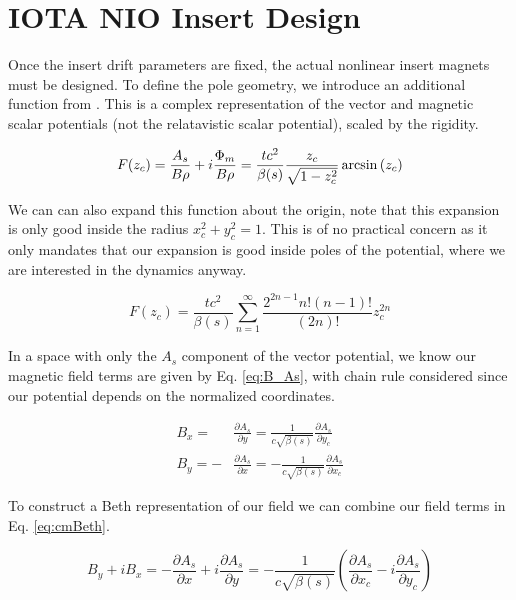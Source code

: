 \section{IOTA NIO Insert Design} \label{sec:nioDesign}
Once the insert drift parameters are fixed, the actual nonlinear insert magnets must be designed. To define the pole geometry, we introduce an additional function from \cite{mitchellComplex}. This is a complex representation of the vector and magnetic scalar potentials (not the relatavistic scalar potential), scaled by the rigidity.

\begin{equation} \label{eq:genF}
	F(z_c) = \frac{A_s}{B\rho} + i\frac{\Phi_m}{B\rho} = \frac{t c^2}{\beta(s)}\frac{z_c}{\sqrt{1-z_c^2}} \arcsin{(z_c)} \\ 
\end{equation}

We can can also expand this function about the origin, note that this expansion is only good inside the radius $x_c^2 + y_c^2 = 1$. This is of no practical concern as it only mandates that our expansion is good inside poles of the potential, where we are interested in the dynamics anyway.

\begin{equation} \label{eq:powF}
	F(z_c) = \frac{t c^2}{\beta(s)} \sum_{n=1}^{\infty} \frac{2^{2n-1}n!(n-1)!}{(2n)!} z_c^{2n}
\end{equation}

In a space with only the $A_s$ component of the vector potential, we know our magnetic field terms are given by Eq. \ref{eq:B_As}, with chain rule considered since our potential depends on the normalized coordinates.

\begin{equation} \label{eq:B_As}
\begin{split}
	B_x = &\frac{\partial A_s}{\partial y} = \frac{1}{c\sqrt{\beta(s)}}\frac{\partial A_s}{\partial y_c}\\
	B_y = -&\frac{\partial A_s}{\partial x} = -\frac{1}{c\sqrt{\beta(s)}}\frac{\partial A_s}{\partial x_c}
\end{split}
\end{equation}

To construct a Beth representation of our field we can combine our field terms in Eq. \ref{eq:cmBeth}.

\begin{equation} \label{eq:cmBeth}
	B_y + i B_x  = -\frac{\partial A_s}{\partial x} + i\frac{\partial A_s}{\partial y} = -\frac{1}{c\sqrt{\beta(s)}}\left(\frac{\partial A_s}{\partial x_c} - i\frac{\partial A_s}{\partial y_c}\right)
\end{equation}

